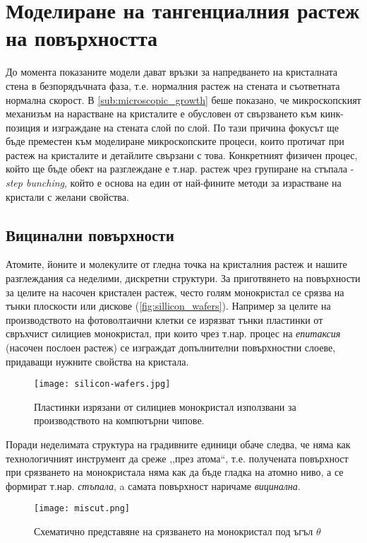 \section{Моделиране на тангенциалния растеж на повърхността}
До момента показаните модели дават връзки за напредването на кристалната стена в безпорядъчната фаза, т.е. нормалния растеж на стената и съответната нормална скорост. В \autoref{sub:microscopic_growth} беше показано, че микроскопският механизъм на нарастване на кристалите е обусловен от свързването към кинк-позиция и изграждане на стената слой по слой. По тази причина фокусът ще бъде преместен към моделиране микроскопските процеси, които протичат при растеж на кристалите и детайлите свързани с това. Конкретният физичен процес, който ще бъде обект на разглеждане е т.нар. растеж чрез групиране на стъпала - \textit{step bunching}, който е основа на един от най-фините методи за израстване на кристали с желани свойства.
\subsection{Вицинални повърхности}
Атомите, йоните и молекулите от гледна точка на кристалния растеж и нашите разглеждания са неделими, дискретни структури. За приготвянето на повърхности за целите на насочен кристален растеж, често голям монокристал се срязва на тънки плоскости или дискове (\autoref{fig:sillicon_wafers}). Например за целите на производството на фотоволтаични клетки се изрязват тънки пластинки от свръхчист силициев монокристал, при които чрез т.нар. процес на \textit{епитаксия} (насочен послоен растеж) се изграждат допълнителни повърхностни слоеве, придаващи нужните свойства на кристала.
\begin{figure}[htbp]
	\centering
	\texttt{[image: silicon-wafers.jpg]}
	\caption{Пластинки изрязани от силициев монокристал използвани за производството на компютърни чипове. \cite{debold_waffers_2011}}
	\label{fig:sillicon_wafers}
\end{figure}
Поради неделимата структура на градивните единици обаче следва, че няма как технологичният инструмент да среже ,,през атома``, т.е. получената повърхност при срязването на монокристала няма как да бъде гладка на атомно ниво, а се формират т.нар. \textit{стъпала}, a самата повърхност наричаме \textit{вицинална}.
\begin{figure}[htbp]
	\centering
	\texttt{[image: miscut.png]}
	\caption{Схематично представяне на срязването на монокристал под ъгъл $\theta$}
	\label{fig:miscut_crystal}
\end{figure}

